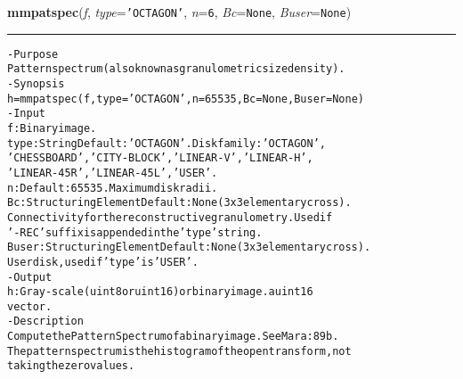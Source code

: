     \begin{boxedminipage}{\textwidth}

    \raggedright \textbf{mmpatspec}(\textit{f}, \textit{type}=\texttt{'\-O\-C\-T\-A\-G\-O\-N\-'\-}, \textit{n}=\texttt{6\-}, \textit{Bc}=\texttt{N\-o\-n\-e\-}, \textit{Buser}=\texttt{N\-o\-n\-e\-})

    \vspace{-1.5ex}

    \rule{\textwidth}{0.5\fboxrule}
\begin{alltt}
- Purpose
    Pattern spectrum (also known as granulometric size density).
- Synopsis
    h = mmpatspec(f, type='OCTAGON', n=65535, Bc=None, Buser=None)
- Input
    f:     Binary image.
    type:  String Default: 'OCTAGON'. Disk family: 'OCTAGON',
           'CHESSBOARD', 'CITY-BLOCK', 'LINEAR-V', 'LINEAR-H',
           'LINEAR-45R', 'LINEAR-45L', 'USER'.
    n:     Default: 65535. Maximum disk radii.
    Bc:    Structuring Element Default: None (3x3 elementary cross).
           Connectivity for the reconstructive granulometry. Used if
           '-REC' suffix is appended in the 'type' string.
    Buser: Structuring Element Default: None (3x3 elementary cross).
           User disk, used if 'type' is 'USER'.
- Output
    h: Gray-scale (uint8 or uint16) or binary image. a uint16
       vector.
- Description
    Compute the Pattern Spectrum of a binary image. See Mara:89b .
    The pattern spectrum is the histogram of the open transform, not
    taking the zero values.\end{alltt}

    \vspace{1ex}

    \end{boxedminipage}

    \label{multireg:num_pymorph:mmplot}
    \vspace{0.5ex}

